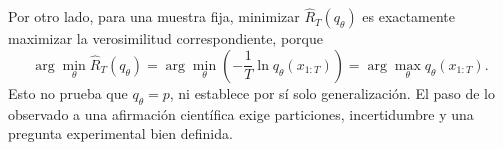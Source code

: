 Por otro lado, para una muestra fija, minimizar $\widehat R_T(q_\theta)$
es exactamente maximizar la verosimilitud correspondiente, porque
\[
\arg\min_\theta\widehat R_T(q_\theta)
=\arg\min_\theta\left(-\frac1T\ln q_\theta(x_{1:T})\right)
=\arg\max_\theta q_\theta(x_{1:T}).
\]
Esto no prueba que $q_\theta=p$, ni establece por sí solo generalización.
El paso de lo observado a una afirmación científica exige particiones,
incertidumbre y una pregunta experimental bien definida.
